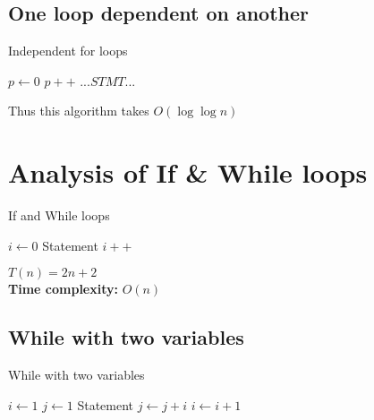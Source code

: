 \documentclass{article}
\begin{document}
\subsection{One loop dependent on another}
\begin{algorithm}[H]
    \caption{Independent for loops}\label{simple_for}
    \begin{algorithmic}
        \State $p \gets 0$
            \State $p++$ 
        \EndFor
            \State $...STMT...$ 
        \EndFor
    \end{algorithmic}
\end{algorithm}
\noindent
Thus this algorithm takes $O(\log{\log{n}})$\\

\section{Analysis of If \& While loops}
\begin{algorithm}[H]
    \caption{If and While loops}\label{simple_for}
    \begin{algorithmic}
        \State $i \gets 0$ 
         
            \State Statement 
            \State $i++$ 
        \EndWhile
    \end{algorithmic}
\end{algorithm}

$T(n) = 2n + 2$\\
\textbf{Time complexity:} $O(n)$

\subsection{While with two variables}
\begin{algorithm}[H]
    \caption{While with two variables}\label{twovar_while}
    \begin{algorithmic}
        \State $i \gets 1$
        \State $j \gets 1$
            \State Statement
            \State $j \gets j+i$
            \State $i \gets i + 1$
        \EndWhile
    \end{algorithmic}
\end{algorithm}
\end{document}
